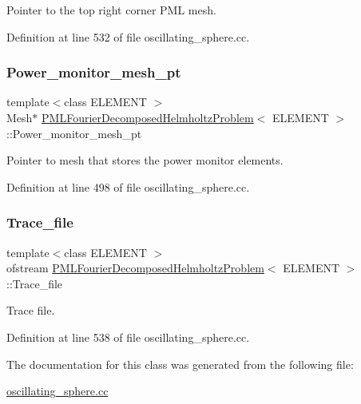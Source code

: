 Pointer to the top right corner P\+ML mesh. 



Definition at line 532 of file oscillating\+\_\+sphere.\+cc.

\mbox{\label{classPMLFourierDecomposedHelmholtzProblem_a9ffebfa69944e405eb28a4b2bd03336e}} 
\subsubsection{\texorpdfstring{Power\+\_\+monitor\+\_\+mesh\+\_\+pt}{Power\_monitor\_mesh\_pt}}
{\footnotesize\ttfamily template$<$class E\+L\+E\+M\+E\+NT $>$ \\
Mesh$\ast$ \hyperlink{classPMLFourierDecomposedHelmholtzProblem}{P\+M\+L\+Fourier\+Decomposed\+Helmholtz\+Problem}$<$ E\+L\+E\+M\+E\+NT $>$\+::Power\+\_\+monitor\+\_\+mesh\+\_\+pt\hspace{0.3cm}{\ttfamily [private]}}



Pointer to mesh that stores the power monitor elements. 



Definition at line 498 of file oscillating\+\_\+sphere.\+cc.

\mbox{\label{classPMLFourierDecomposedHelmholtzProblem_a9810d1dd58cec1f8b1cfc54ea37a7efd}} 
\subsubsection{\texorpdfstring{Trace\+\_\+file}{Trace\_file}}
{\footnotesize\ttfamily template$<$class E\+L\+E\+M\+E\+NT $>$ \\
ofstream \hyperlink{classPMLFourierDecomposedHelmholtzProblem}{P\+M\+L\+Fourier\+Decomposed\+Helmholtz\+Problem}$<$ E\+L\+E\+M\+E\+NT $>$\+::Trace\+\_\+file\hspace{0.3cm}{\ttfamily [private]}}



Trace file. 



Definition at line 538 of file oscillating\+\_\+sphere.\+cc.



The documentation for this class was generated from the following file\+:\begin{DoxyCompactItemize}
\item 
\hyperlink{oscillating__sphere_8cc}{oscillating\+\_\+sphere.\+cc}\end{DoxyCompactItemize}
